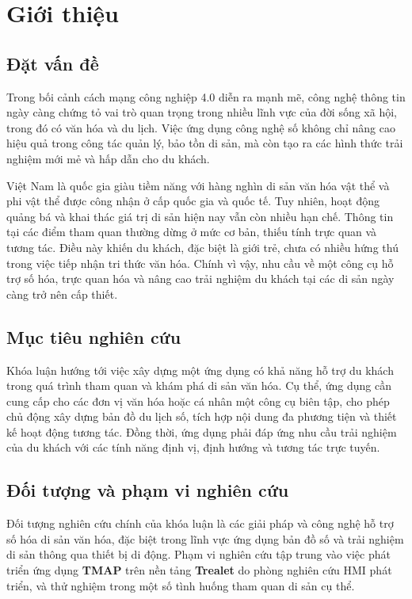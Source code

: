 \chapter{Giới thiệu}

\section{Đặt vấn đề}
Trong bối cảnh cách mạng công nghiệp 4.0 diễn ra mạnh mẽ, công nghệ thông tin ngày càng chứng tỏ vai trò quan trọng trong nhiều lĩnh vực của đời sống xã hội, trong đó có văn hóa và du lịch. Việc ứng dụng công nghệ số không chỉ nâng cao hiệu quả trong công tác quản lý, bảo tồn di sản, mà còn tạo ra các hình thức trải nghiệm mới mẻ và hấp dẫn cho du khách. 

Việt Nam là quốc gia giàu tiềm năng với hàng nghìn di sản văn hóa vật thể và phi vật thể được công nhận ở cấp quốc gia và quốc tế. Tuy nhiên, hoạt động quảng bá và khai thác giá trị di sản hiện nay vẫn còn nhiều hạn chế. Thông tin tại các điểm tham quan thường dừng ở mức cơ bản, thiếu tính trực quan và tương tác. Điều này khiến du khách, đặc biệt là giới trẻ, chưa có nhiều hứng thú trong việc tiếp nhận tri thức văn hóa. Chính vì vậy, nhu cầu về một công cụ hỗ trợ số hóa, trực quan hóa và nâng cao trải nghiệm du khách tại các di sản ngày càng trở nên cấp thiết.  

\section{Mục tiêu nghiên cứu}
Khóa luận hướng tới việc xây dựng một ứng dụng có khả năng hỗ trợ du khách trong quá trình tham quan và khám phá di sản văn hóa. Cụ thể, ứng dụng cần cung cấp cho các đơn vị văn hóa hoặc cá nhân một công cụ biên tập, cho phép chủ động xây dựng bản đồ du lịch số, tích hợp nội dung đa phương tiện và thiết kế hoạt động tương tác. Đồng thời, ứng dụng phải đáp ứng nhu cầu trải nghiệm của du khách với các tính năng định vị, định hướng và tương tác trực tuyến.  

\section{Đối tượng và phạm vi nghiên cứu}
Đối tượng nghiên cứu chính của khóa luận là các giải pháp và công nghệ hỗ trợ số hóa di sản văn hóa, đặc biệt trong lĩnh vực ứng dụng bản đồ số và trải nghiệm di sản thông qua thiết bị di động. Phạm vi nghiên cứu tập trung vào việc phát triển ứng dụng \textbf{TMAP} trên nền tảng \textbf{Trealet} do phòng nghiên cứu HMI phát triển, và thử nghiệm trong một số tình huống tham quan di sản cụ thể.  

